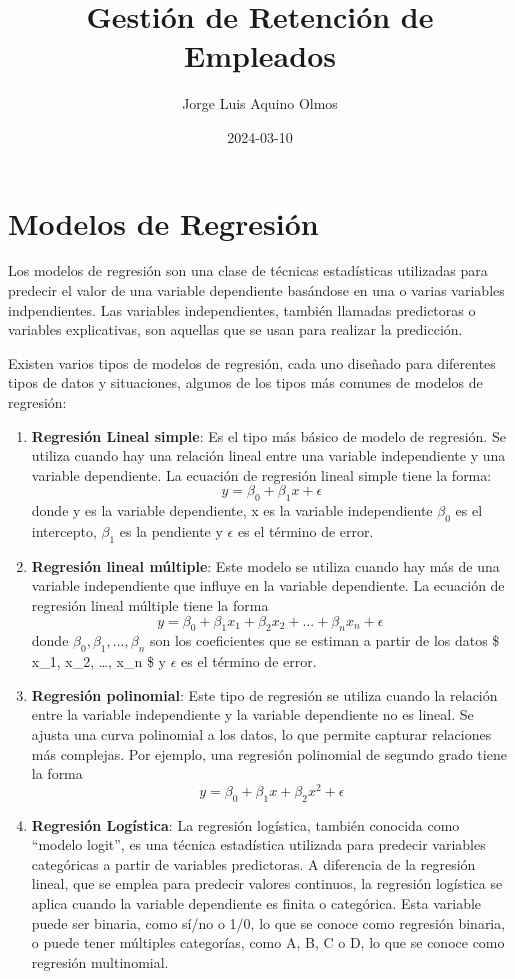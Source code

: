 \documentclass[
]{article}
\title{Gestión de Retención de Empleados}
\author{Jorge Luis Aquino Olmos}
\date{2024-03-10}
\begin{document}
\maketitle

\hypertarget{modelos-de-regresiuxf3n}{%
\section{Modelos de Regresión}\label{modelos-de-regresiuxf3n}}

Los modelos de regresión son una clase de técnicas estadísticas
utilizadas para predecir el valor de una variable dependiente basándose
en una o varias variables indpendientes. Las variables independientes,
también llamadas predictoras o variables explicativas, son aquellas que
se usan para realizar la predicción.

Existen varios tipos de modelos de regresión, cada uno diseñado para
diferentes tipos de datos y situaciones, algunos de los tipos más
comunes de modelos de regresión:

\begin{enumerate}
\def\labelenumi{\arabic{enumi}.}
\item
  \textbf{Regresión Lineal simple}: Es el tipo más básico de modelo de
  regresión. Se utiliza cuando hay una relación lineal entre una
  variable independiente y una variable dependiente. La ecuación de
  regresión lineal simple tiene la forma:
  \[ y = \beta_0 + \beta_1x + \epsilon\] donde y es la variable
  dependiente, x es la variable independiente \(\beta_0\) es el
  intercepto, \(\beta_1\) es la pendiente y \(\epsilon\) es el término
  de error.
\item
  \textbf{Regresión lineal múltiple}: Este modelo se utiliza cuando hay
  más de una variable independiente que influye en la variable
  dependiente. La ecuación de regresión lineal múltiple tiene la forma
  \[y = \beta_0 + \beta_1 x_1 + \beta_2 x_2 + ... + \beta_nx_n + \epsilon\ \]donde
  \(\beta_0, \beta_1, ... ,\beta_n\) son los coeficientes que se estiman
  a partir de los datos \$ x\_1, x\_2, \ldots, x\_n \$ y \(\epsilon\) es
  el término de error.
\item
  \textbf{Regresión polinomial}: Este tipo de regresión se utiliza
  cuando la relación entre la variable independiente y la variable
  dependiente no es lineal. Se ajusta una curva polinomial a los datos,
  lo que permite capturar relaciones más complejas. Por ejemplo, una
  regresión polinomial de segundo grado tiene la forma
  \[ y=\beta_0+\beta_1x+\beta_2x^2+\epsilon \]
\item
  \textbf{Regresión Logística}: La regresión logística, también conocida
  como ``modelo logit'', es una técnica estadística utilizada para
  predecir variables categóricas a partir de variables predictoras. A
  diferencia de la regresión lineal, que se emplea para predecir valores
  continuos, la regresión logística se aplica cuando la variable
  dependiente es finita o categórica. Esta variable puede ser binaria,
  como sí/no o 1/0, lo que se conoce como regresión binaria, o puede
  tener múltiples categorías, como A, B, C o D, lo que se conoce como
  regresión multinomial.
\end{enumerate}
\end{document}
